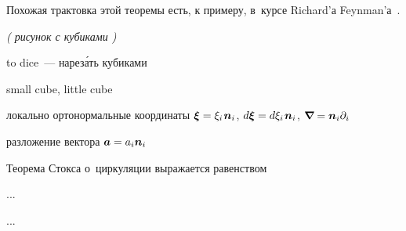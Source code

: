 \begin{otherlanguage}{russian}
Похожая трактовка этой теоремы есть, к примеру, в~курсе Richard’а Feynman’а~\cite{feynman-lecturesonphysics}.

\emph{( рисунок с кубиками )}

to dice~--- нарез\'{а}ть кубиками

small cube, little cube

локально ортонормальные координаты ${\bm{\xi} = \xi_i \hspace{.2ex} \bm{n}_i \hspace{.1ex}}$, ${d\bm{\xi} = d \xi_i \hspace{.2ex} \bm{n}_i}$, ${\bm{\nabla}\hspace{-0.2ex} = \bm{n}_i \partial_i}$

разложение вектора ${\bm{a} = a_i \bm{n}_i \hspace{.1ex}}$

Теорема Стокса о~циркуляции выражается равенством

...

\newpage ...



\end{otherlanguage}



\newpage



\label{para:curvaturetensors}

